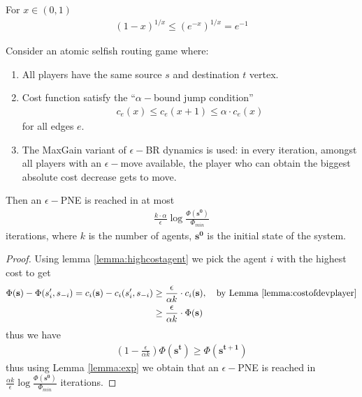 \begin{lemma}
For $x\in (0,1)$
\begin{align*}
(1-x)^{1/x}\leq (e^{-x})^{1/x}=e^{-1}
\end{align*}
\label{lemma:exp}
\end{lemma}


\begin{thm}
Consider an atomic selfish routing game where:
\begin{enumerate}[1.]
\item All players have the same source $s$ and destination $t$ vertex.
\item Cost function satisfy the ``$\alpha-$bound jump condition''
\begin{align*}
c_e(x)\leq c_e(x+1)\leq\alpha\cdot c_e(x)
\end{align*}
for all edges $e$.
\item The MaxGain variant of $\epsilon-$BR dynamics is used: in every iteration, amongst all players with an $\epsilon-$move available, the player who can obtain the biggest absolute cost decrease gets to move.
\end{enumerate}
 Then an $\epsilon-$PNE is reached in at most
 \begin{align*}
 \frac{k \cdot \alpha}{\epsilon}\log\frac{\Phi(\mathbf{s^0})}{\Phi_{min}}
 \end{align*}
 iterations, where $k$ is the number of agents, $\mathbf{s^0}$ is the initial state of the system.
 \begin{proof}
 Using lemma \ref{lemma:highcostagent} we pick the agent $i$ with the highest cost to get
 \begin{align*}
 \Phi(\mathbf{s})-\Phi(s'_i,s_{-i})= c_i(\mathbf{s})-c_i(s'_i,s_{-i}) &\geq \frac{\epsilon}{\alpha k}\cdot c_i(\mathbf{s}),\quad \text{by Lemma \ref{lemma:costofdevplayer}}\\
 &\geq \frac{\epsilon}{\alpha 	k}\cdot \Phi(\mathbf{s})
 \end{align*}
 thus we have
 \begin{align*}
\left(1-\frac{\epsilon}{\alpha 	k}\right) \Phi(\mathbf{s^t}) \geq \Phi(\mathbf{s^{t+1}}) 
 \end{align*}
 thus using Lemma \ref{lemma:exp} we obtain that an $\epsilon-$PNE is reached in $\frac{\alpha k}{\epsilon}\log \frac{\Phi(\mathbf{s^0})}{\Phi_{min}}$ iterations.
 \end{proof}
\end{thm}


